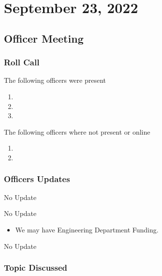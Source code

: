 \newpage

\section{September 23, 2022}
\subsection{Officer Meeting}

\subsubsection{Roll Call}
The following officers were present

\begin{enumerate}
\item \tresurer
\item \secretary
\item \president
\end{enumerate}

The following officers where not present or online

\begin{enumerate}
    \item \primaryprogrammer
    \item \vicepresident
\end{enumerate}

\subsubsection{Officers Updates}

\textbf{\president}

No Update

\textbf{\vicepresident}

No Update

\textbf{\tresurer}

\begin{itemize}
    \item We may have Engineering Department Funding.
\end{itemize}

\textbf{\primaryprogrammer}

\textbf{\secretary}

No Update

\subsubsection{Topic Discussed}

